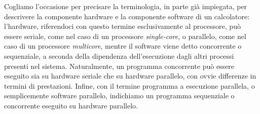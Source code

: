 Cogliamo l'occasione per precisare la terminologia, in parte gi\`a impiegata, per descrivere la componente hardware e la componente software di un calcolatore: l'hardware, riferendoci con questo termine esclusivamente al processore, pu\`o essere seriale, come nel caso di un processore \textit{single-core}, o parallelo, come nel caso di un processore \textit{multicore}, mentre il software viene detto concorrente o sequenziale, a seconda della dipendenza dell'esecuzione dagli altri processi presenti nel sistema.\newline
Naturalmente, un programma concorrente pu\`o essere eseguito sia su hardware seriale che su hardware parallelo, con ovvie differenze in termini di prestazioni.\newline
Infine, con il termine programma a esecuzione parallela, o semplicemente software parallelo, indichiamo un programma sequenziale o concorrente eseguito su hardware parallelo.